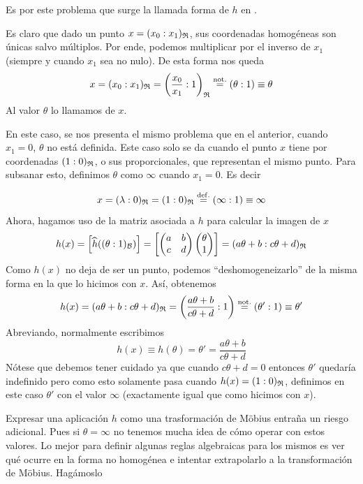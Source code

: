 Es por este problema que surge la llamada forma de $h$ en .

Es claro que dado un punto $x=(x_0:x_1)_{\mathfrak{R}}$, sus coordenadas homogéneas son únicas salvo múltiplos. Por ende, podemos multiplicar por el inverso de $x_1$ (siempre y cuando $x_1$ sea no nulo). De esta forma nos queda
\[x=(x_0:x_1)_{\mathfrak{R}}=\left(\frac{x_0}{x_1}:1\right)_{\mathfrak{R}}\stackrel{\mathrm{not.}}{=}(\theta:1)\equiv\theta\]
Al valor $\theta$ lo llamamos  de $x$.

En este caso, se nos presenta el mismo problema que en el anterior, cuando $x_1=0$, $\theta$ no está definida. Este caso solo se da cuando el punto $x$ tiene por coordenadas $(1:0)_{\mathfrak{R}}$, o sus proporcionales, que representan el mismo punto. Para subsanar esto, definimos $\theta$ como $\infty$ cuando $x_1=0$. Es decir

\[x=(\lambda:0)_{\mathfrak{R}}=(1:0)_{\mathfrak{R}}\stackrel{\mathrm{def.}}{=}(\infty:1)\equiv\infty\]
Ahora, hagamos uso de la matriz asociada a $h$ para calcular la imagen de $x$
\[h(x)=\left [ \widehat{h}((\theta:1)_{\mathcal{B}}) \right ]=\left [ \begin{pmatrix}
	a & b\\
	c & d
	\end{pmatrix}\begin{pmatrix}
	\theta\\
	1
	\end{pmatrix} \right ]=(a\theta+b:c\theta+d)_{\mathfrak{R}}\]
Como $h(x)$ no deja de ser un punto, podemos ``deshomogeneizarlo'' de la misma forma en la que lo hicimos con $x$. Así, obtenemos
\[h(x)=(a\theta+b:c\theta+d)_{\mathfrak{R}}=\left(\frac{a\theta+b}{c\theta+d}:1\right)\stackrel{\mathrm{not.}}{=}(\theta':1)\equiv\theta'\]
Abreviando, normalmente escribimos
\begin{equation}
	h(x)\equiv h(\theta)=\theta'=\frac{a\theta+b}{c\theta+d}
\end{equation}
Nótese que debemos tener cuidado ya que cuando $c\theta+d=0$ entonces $\theta'$ quedaría indefinido pero como esto solamente pasa cuando $h(x)=(1:0)_{\mathfrak{R}}$, definimos en este caso $\theta'$ con el valor $\infty$ (exactamente igual que como hicimos con $x$).

Expresar una aplicación $h$ como una trasformación de Möbius entraña un riesgo adicional. Pues si $\theta=\infty$ no tenemos mucha idea de cómo operar con estos valores. Lo mejor para definir algunas reglas algebraicas para los mismos es ver qué ocurre en la forma no homogénea e intentar extrapolarlo a la transformación de Möbius. Hagámoslo

